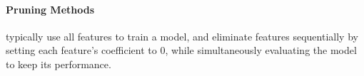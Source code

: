 \paragraph{Pruning Methods}
\label{par:methods.flat.embedded.pruning}

  
typically use all features to train a model,
and eliminate features sequentially by setting each feature's coefficient to
$0$, while simultaneously evaluating the model to keep its performance.

